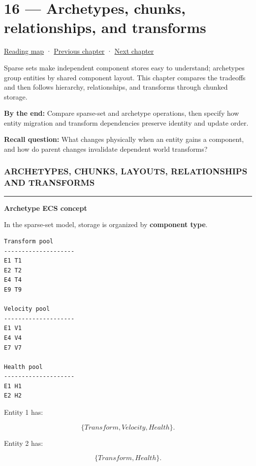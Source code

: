 \hypertarget{05-engine-i-ch016}{}
\section{16 --- Archetypes, chunks, relationships, and transforms}\label{archetypes-chunks-relationships-and-transforms}

\href{Chapter\%20Edition/03\%20-\%20Game\%20Engine/00\%20-\%20Reading\%20Map}{Reading map} · \hyperref[05-engine-i-ch015]{Previous chapter} · \hyperref[05-engine-i-ch017]{Next chapter}

Sparse sets make independent component stores easy to understand; archetypes group entities by shared component layout. This chapter compares the tradeoffs and then follows hierarchy, relationships, and transforms through chunked storage.

\textbf{By the end:} Compare sparse-set and archetype operations, then specify how entity migration and transform dependencies preserve identity and update order.

\textbf{Recall question:} What changes physically when an entity gains a component, and how do parent changes invalidate dependent world transforms?

\subsubsection{ARCHETYPES, CHUNKS, LAYOUTS, RELATIONSHIPS AND TRANSFORMS}\label{archetypes-chunks-layouts-relationships-and-transforms}

\begin{center}\rule{0.5\linewidth}{0.5pt}\end{center}

\textbf{Archetype ECS concept}

In the sparse-set model, storage is organized by \textbf{component type}.

\begin{verbatim}
Transform pool
--------------------
E1 T1
E2 T2
E4 T4
E9 T9

Velocity pool
--------------------
E1 V1
E4 V4
E7 V7

Health pool
--------------------
E1 H1
E2 H2
\end{verbatim}

Entity 1 has:

\[
\{Transform,Velocity,Health\}.
\]

Entity 2 has:

\[
\{Transform,Health\}.
\]

